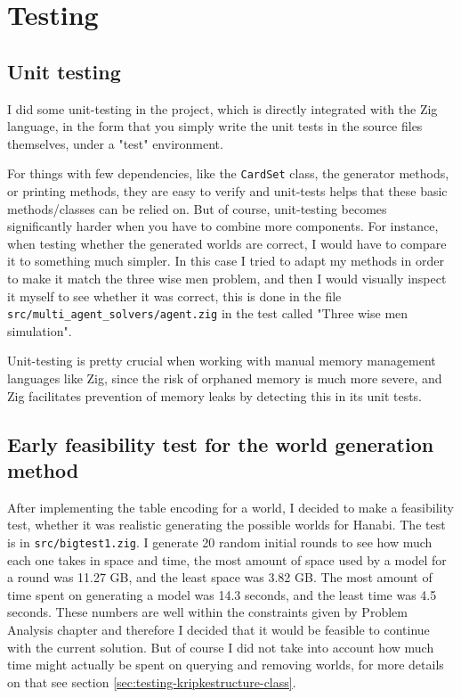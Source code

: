 \section{Testing}
\subsection{Unit testing}
I did some unit-testing in the project, which is directly integrated with the Zig language, in the form that you simply write the unit tests in the source files themselves, under a "test" environment. 

For things with few dependencies, like the {\tt CardSet} class, the generator methods, or printing methods, they are easy to verify and unit-tests helps that these basic methods/classes can be relied on.
But of course, unit-testing becomes significantly harder when you have to combine more components.
For instance, when testing whether the generated worlds are correct, I would have to compare it to something much simpler.
In this case I tried to adapt my methods in order to make it match the three wise men problem, and then I would visually inspect it myself to see whether it was correct, this is done in the file {\tt src/multi\_agent\_solvers/agent.zig} in the test called "Three wise men simulation".

Unit-testing is pretty crucial when working with manual memory management languages like Zig, since the risk of orphaned memory is much more severe, and Zig facilitates prevention of memory leaks by detecting this in its unit tests. 


\subsection{Early feasibility test for the world generation method}
After implementing the table encoding for a world, I decided to make a feasibility test, whether it was realistic generating the possible worlds for Hanabi.
The test is in {\tt src/bigtest1.zig}.
I generate 20 random initial rounds to see how much each one takes in space and time, the most amount of space used by a model for a round was 11.27 GB, and the least space was 3.82 GB.
The most amount of time spent on generating a model was 14.3 seconds, and the least time was 4.5 seconds.
These numbers are well within the constraints given by Problem Analysis chapter and therefore I decided that it would be feasible to continue with the current solution.
But of course I did not take into account how much time might actually be spent on querying and removing worlds, for more details on that see section \ref{sec:testing-kripkestructure-class}.

